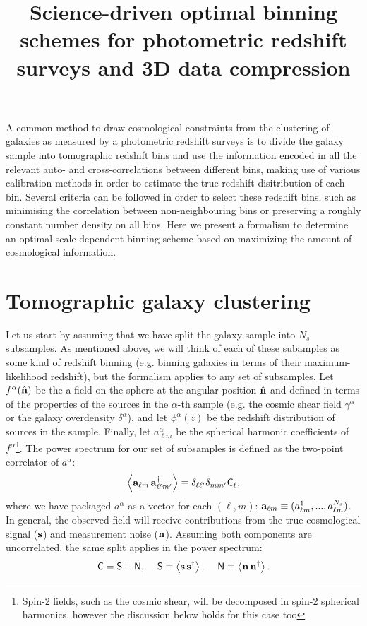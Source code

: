 \documentclass[a4paper,10pt]{article}
\title{Science-driven optimal binning schemes for photometric redshift surveys and 3D data compression}
\author{}
\newcommand{\nv}{\hat{\bf n}}
\begin{document}
\maketitle

A common method to draw cosmological constraints from the clustering of galaxies as measured by a photometric redshift surveys is to divide the galaxy sample into tomographic redshift bins and use the information encoded in all the relevant auto- and cross-correlations between different bins, making use of various calibration methods in order to estimate the true redshift disitribution of each bin. Several criteria can be followed in order to select these redshift bins, such as minimising the correlation between non-neighbouring bins or preserving a roughly constant number density on all bins. Here we present a formalism to determine an optimal scale-dependent binning scheme based on maximizing the amount of cosmological information.

\section{Tomographic galaxy clustering}
  Let us start by assuming that we have split the galaxy sample into $N_s$ subsamples. As mentioned above, we will think of each of these subamples as some kind of redshift binning (e.g. binning galaxies in terms of their maximum-likelihood redshift), but the formalism applies to any set of subsamples. Let $f^\alpha(\nv)$ be the a field on the sphere at the angular position $\nv$ and defined in terms of the properties of the sources in the $\alpha$-th sample (e.g. the cosmic shear field $\gamma^\alpha$ or the galaxy overdensity $\delta^\alpha$), and let $\phi^\alpha(z)$ be the redshift distribution of sources in the sample. Finally, let $a^\alpha_{\ell m}$ be the spherical harmonic coefficients of $f^\alpha$\footnote{Spin-2 fields, such as the cosmic shear, will be decomposed in spin-2 spherical harmonics, however the discussion below holds for this case too}. The power spectrum for our set of subsamples is defined as the two-point correlator of $a^\alpha$:
  \begin{equation}
    \left\langle {\bf a}_{\ell m}\,{\bf a}^\dag_{\ell' m'} \right\rangle\equiv\delta_{\ell\ell'}\delta_{mm'}{\sf C}_\ell,
  \end{equation}
  where we have packaged $a^\alpha$ as a vector for each $(\ell,m)$: ${\bf a}_{\ell m}\equiv(a^1_{\ell m},...,a^{N_s}_{\ell m})$. In general, the observed field will receive contributions from the true cosmological signal (${\bf s}$) and measurement noise (${\bf n}$). Assuming both components are uncorrelated, the same split applies in the power spectrum:
  \begin{equation}
    {\sf C}={\sf S}+{\sf N},\hspace{12pt}
    {\sf S}\equiv\left\langle{\bf s}\,{\bf s}^\dag\right\rangle, \hspace{12pt}
    {\sf N}\equiv\left\langle{\bf n}\,{\bf n}^\dag\right\rangle.
  \end{equation}
  
\end{document}
